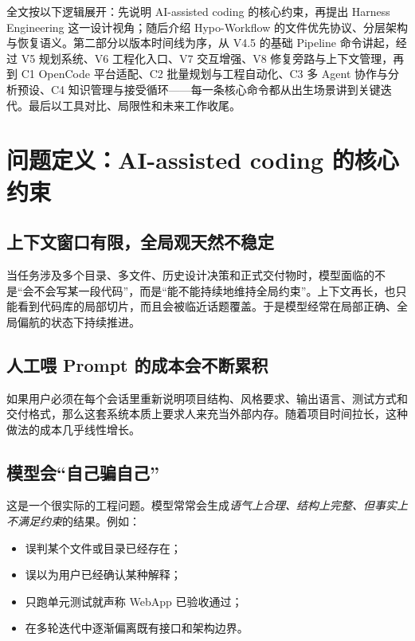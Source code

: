 \documentclass[
  outputdir=build,
  chapterstyle=cn,
  colorscheme=Simple,
  fontset=tech,
  code=false
]{Hypo-Note}
\begin{document}
全文按以下逻辑展开：先说明 AI-assisted coding 的核心约束，再提出 Harness Engineering 这一设计视角；随后介绍 Hypo-Workflow 的文件优先协议、分层架构与恢复语义。第二部分以版本时间线为序，从 V4.5 的基础 Pipeline 命令讲起，经过 V5 规划系统、V6 工程化入口、V7 交互增强、V8 修复旁路与上下文管理，再到 C1 OpenCode 平台适配、C2 批量规划与工程自动化、C3 多 Agent 协作与分析预设、C4 知识管理与接受循环——每一条核心命令都从出生场景讲到关键迭代。最后以工具对比、局限性和未来工作收尾。

\chapter{问题定义：AI-assisted coding 的核心约束}

\section{上下文窗口有限，全局观天然不稳定}

当任务涉及多个目录、多文件、历史设计决策和正式交付物时，模型面临的不是“会不会写某一段代码”，而是“能不能持续地维持全局约束”。上下文再长，也只能看到代码库的局部切片，而且会被临近话题覆盖。于是模型经常在局部正确、全局偏航的状态下持续推进。

\section{人工喂 Prompt 的成本会不断累积}

如果用户必须在每个会话里重新说明项目结构、风格要求、输出语言、测试方式和交付格式，那么这套系统本质上要求人来充当外部内存。随着项目时间拉长，这种做法的成本几乎线性增长。

\section{模型会“自己骗自己”}

这是一个很实际的工程问题。模型常常会生成\emph{语气上合理、结构上完整、但事实上不满足约束}的结果。例如：

\begin{itemize}[leftmargin=2em]
  \item 误判某个文件或目录已经存在；
  \item 误以为用户已经确认某种解释；
  \item 只跑单元测试就声称 WebApp 已验收通过；
  \item 在多轮迭代中逐渐偏离既有接口和架构边界。
\end{itemize}
\end{document}

